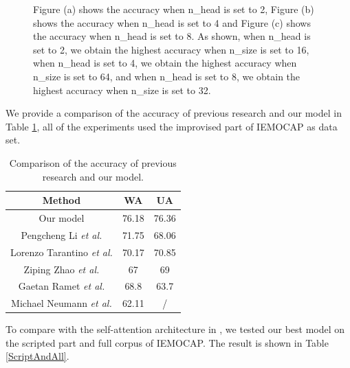 \documentclass[10pt, conference, compsocconf]{IEEEtran}
\begin{document}
\begin{figure}[h]
{\begin{minipage}{8cm}
	\end{minipage}}
	\caption{Figure (a) shows the accuracy when n\_head is set to 2, Figure (b) shows the accuracy when n\_head is set to 4 and Figure (c) shows the accuracy when n\_head is set to 8. As shown, when n\_head is set to 2, we obtain the highest accuracy when n\_size is set to 16, when n\_head is set to 4, we obtain the highest accuracy when n\_size is set to 64, and when n\_head is set to 8, we obtain the highest accuracy when n\_size is set to 32.}
	\label{SizeResult}
\end{figure}

We provide a comparison of the accuracy of previous research and our model in Table \ref{previous}, all of the experiments used the improvised part of IEMOCAP as data set.

\begin{table}[h]
	\renewcommand\arraystretch{1.5}
	\setlength{\abovecaptionskip}{-0.2cm}
	\caption{Comparison of the accuracy of previous research and our model.}
	\label{previous}
	\begin{center}  
		\begin{tabular}{|c|c|c|} 
			\hline  
			Method & WA & UA\\   
			\hline  
			Our model & 76.18 & 76.36 \\   
			\hline
			Pengcheng Li \emph{et al.}\cite{li2018attention} & 71.75 & 68.06 \\   			
			\hline
			Lorenzo Tarantino \emph{et al.}\cite{tarantino2019self} & 70.17 & 70.85 \\   
			\hline
			Ziping Zhao \emph{et al.}\cite{zhao2019attention} & 67 & 69 \\   
			\hline
			Gaetan Ramet \emph{et al.}\cite{ramet2018context} & 68.8 & 63.7 \\   
			\hline
			Michael Neumann \emph{et al.}\cite{neumann2017attentive} & 62.11 & / \\   
			\hline
		\end{tabular}  
	\end{center}  
\end{table}

To compare with the self-attention architecture in \cite{tarantino2019self}, we tested our best model on the scripted part and full corpus of IEMOCAP. The result is shown in Table \ref{ScriptAndAll}.
\end{document}
